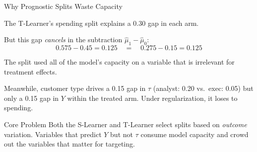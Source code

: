 \documentclass[aspectratio=169, 11pt, handout]{beamer}
\begin{document}
\begin{frame}{Why Prognostic Splits Waste Capacity}
 
The T-Learner's spending split explains a 0.30 gap in each arm.

\bigskip
 
But this gap \emph{cancels} in the subtraction $\hat{\mu}_1 - \hat{\mu}_0$:
\[
0.575 - 0.45 = 0.125 \quad = \quad 0.275 - 0.15 = 0.125
\]
 
\pause
\bigskip
 
The split used all of the model's capacity on a variable that is irrelevant for treatment effects.
 
\bigskip
 
Meanwhile, customer type drives a 0.15 gap in $\tau$ (analyst: 0.20 vs.\ exec: 0.05) but only a 0.15 gap in $Y$ within the treated arm. Under regularization, it loses to spending.
 
\pause
\bigskip
 
\begin{alertblock}{Core Problem}
Both the S-Learner and T-Learner select splits based on \emph{outcome} variation. Variables that predict $Y$ but not $\tau$ consume model capacity and crowd out the variables that matter for targeting.
\end{alertblock}
 
\end{frame}
 
\end{document}

